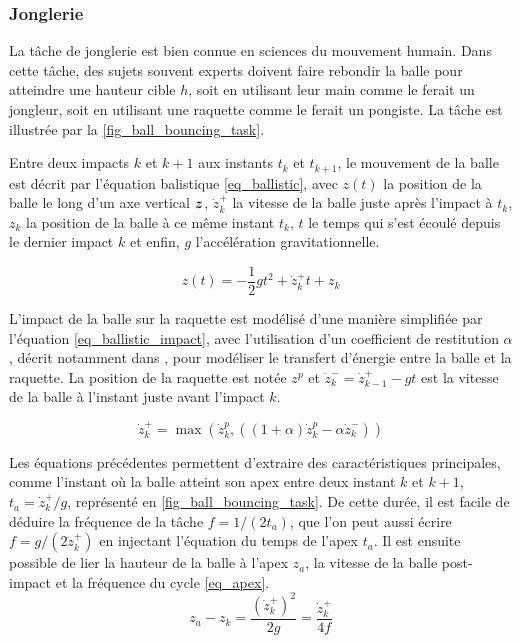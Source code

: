 \documentclass[12pt, a4paper]{article} %
\numberwithin{equation}{section}
\begin{document}
\subsubsection{Jonglerie} \label{sec_bouncing_sub_previous_sub_bouncing}

La tâche de jonglerie est bien connue en sciences du mouvement humain. Dans cette tâche, des sujets souvent experts doivent faire rebondir la balle pour atteindre une hauteur cible $h$, soit en utilisant leur main comme le ferait un jongleur, soit en utilisant une raquette comme le ferait un pongiste. La tâche est illustrée par la \cref{fig_ball_bouncing_task}.
% 
\newlineBlank
%


Entre deux impacts $k$ et $k+1$ aux instants $t_k$ et $t_{k+1}$, le mouvement de la balle est décrit par l'équation balistique \cref{eq_ballistic}, avec $ z(t) $ la position de la balle le long d'un axe vertical $ \vect{z} $, $ \dot{z}_k^+ $ la vitesse de la balle juste après l'impact à $t_k$, $ z_k $ la position de la balle à ce même instant $t_k$, $ t $ le temps qui s'est écoulé depuis le dernier impact $k$ et enfin, $g$ l'accélération gravitationnelle. 

\begin{equation} \label{eq_ballistic}
z(t) = -\frac{1}{2}gt^2+\dot{z}_k^+ t+z_k
\end{equation}

L'impact de la balle sur la raquette est modélisé d'une manière simplifiée par l'équation \cref{eq_ballistic_impact}, avec l'utilisation d'un coefficient de restitution $ \alpha $, décrit notamment dans \cite{avrin_self-organization_2018}, pour modéliser le transfert d'énergie entre la balle et la raquette. La position de la raquette est notée $ z^p $ et $ \dot{z}_{k}^- = \dot{z}^+_{k-1}-gt $ est la vitesse de la balle à l'instant juste avant l'impact $ k $.

\begin{equation} \label{eq_ballistic_impact}
\dot{z}^+_{k} = \max\left(\dot{z}^p_k, \left((1+\alpha)\dot{z}^p_k-\alpha\dot{z}_{k}^-\right)\right)
\end{equation}

Les équations précédentes permettent d'extraire des caractéristiques principales, comme l'instant où la balle atteint son apex entre deux instant $ k $ et $ k+1 $, $ t_a = \dot{z}_k^+/g $, représenté en \cref{fig_ball_bouncing_task}. De cette durée, il est facile de déduire la fréquence de la tâche $ f = 1/(2t_a) $, que l'on peut aussi écrire $ f = g/(2\dot{z}_k^+) $ en injectant l'équation du temps de l'apex $ t_a $. Il est ensuite possible de lier la hauteur de la balle à l'apex $ z_a $, la vitesse de la balle post-impact et la fréquence du cycle \cref{eq_apex}.
%
\begin{equation} \label{eq_apex}
z_a - z_k = \frac{(\dot{z}_k^+)^2}{2g} = \frac{\dot{z}_k^+}{4f}
\end{equation} 
\end{document}
